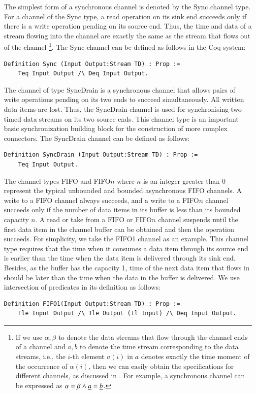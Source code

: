 \documentclass[preprint,3p]{elsarticle}
\begin{document}
The simplest form of a synchronous channel is denoted by the Sync channel type. For a channel of the Sync type, a read operation on
its sink end succeeds only if there is a write operation pending on its source end. Thus, the time and data of a stream flowing
into the channel are exactly the same as the stream that flows out of the channel
\footnote{If we use $\alpha,\beta$ to denote the data streams that flow through the channel ends of a channel and $a,b$ to denote the time stream corresponding to the data streams, i.e., the $i$-th element $a(i)$ in $a$ denotes exactly the time moment of the occurrence of $\alpha(i)$, then we can easily obtain the specifications for different channels, as discussed in \cite{Sun12,SAA+12}. For example, a synchronous channel can be expressed as $\alpha=\beta \wedge \emph{a}=\emph{b}$.}.
The Sync channel can be defined as follows in the Coq system:
\begin{lstlisting}[language=coq]
    Definition Sync (Input Output:Stream TD) : Prop :=
    Teq Input Output /\ Deq Input Output.
\end{lstlisting}


The channel of type SyncDrain is a synchronous channel that allows pairs of write operations pending on its two ends to succeed simultaneously. All written data items are lost. Thus, the SyncDrain channel is used for synchronising two timed data streams on its two source ends. This channel type is an important basic synchronization building block for the construction of more complex connectors. The SyncDrain channel can be defined as follows:
\begin{lstlisting}[language=coq]
    Definition SyncDrain (Input Output:Stream TD) : Prop :=
    Teq Input Output.
\end{lstlisting}


The channel types FIFO and FIFO$n$ where $n$ is an integer greater than $0$ represent the
typical unbounded and bounded asynchronous FIFO channels. A write to a FIFO channel always succeeds, and a write to a FIFO$n$ channel succeeds only if the
number of data items in its buffer is less than its bounded capacity $n$. A read or take from a FIFO or FIFO$n$ channel suspends until the first data item
in the channel buffer can be obtained and then the operation succeeds.
For simplicity, we take the FIFO1 channel as an example. This channel type requires that the time when it consumes a data item through its source end is earlier than the time when the data item is delivered through its sink end. Besides, as the buffer has the capacity 1, time of the next data item that flows in should be later than the time when the data in the buffer is delivered. We use intersection of predicates in its definition as follows:
\begin{lstlisting}[language=coq]
    Definition FIFO1(Input Output:Stream TD) : Prop :=
    Tle Input Output /\ Tle Output (tl Input) /\ Deq Input Output.
\end{lstlisting}
\end{document}
